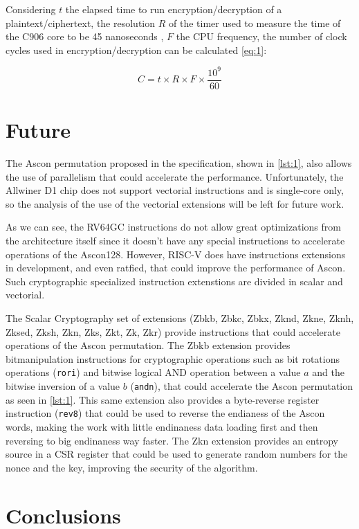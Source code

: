 \documentclass[11pt,twoside]{article}
\begin{document}
Considering $t$ the elapsed time to run encryption/decryption of a plaintext/ciphertext, the resolution $R$ of the timer used to measure the time of the C906 core to be 45 nanoseconds  \cite{10179399}, $F$ the CPU frequency, the number of clock cycles used in encryption/decryption can be calculated \cref{eq:1}:

\begin{equation}
  C = t \times R \times F \times \frac{10^{9}}{60} \label{eq:1}
\end{equation}

\section{Future}

The Ascon permutation proposed in the specification, shown in \cref{lst:1}, also allows the use of parallelism that could accelerate the performance. Unfortunately, the Allwiner D1 chip does not support vectorial instructions and is single-core only, so the analysis of the use of the vectorial extensions will be left for future work.

As we can see, the RV64GC instructions do not allow great optimizations from the architecture itself since it doesn't have any special instructions to accelerate operations of the Ascon128. However, RISC-V does have instructions extensions in development, and even ratfied, that could improve the performance of Ascon. Such cryptographic specialized instruction extenstions are divided in scalar and vectorial.

The Scalar Cryptography set of extensions (Zbkb, Zbkc, Zbkx, Zknd, Zkne, Zknh, Zksed, Zksh, Zkn, Zks, Zkt, Zk, Zkr) \cite{riscvCryptoVol1} provide instructions that could accelerate operations of the Ascon permutation.
The Zbkb extension provides bitmanipulation instructions for cryptographic operations such as bit rotations operations (\texttt{rori}) and bitwise logical AND operation between a value $a$ and the bitwise inversion of a value $b$ (\texttt{andn}), that could accelerate the Ascon permutation as seen in \cref{lst:1}. This same extension also provides a byte-reverse register instruction (\texttt{rev8}) that could be used to reverse the endianess of the Ascon words, making the work with little endinaness data loading first and then reversing to big endinaness way faster. The Zkn extension provides an entropy source in a CSR register that could be used to generate random numbers for the nonce and the key, improving the security of the algorithm.


\section{Conclusions}

\printbibliography
\end{document}
